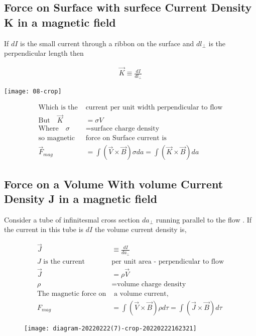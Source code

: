 \subsection{Force on Surface with surfece Current Density K in a magnetic field}
If $d I$ is the small current through a ribbon on the surface and $d l_{\perp}$ is the perpendicular length then \\
\begin{minipage}{.40\textwidth}
	\begin{align*}
	\vec{K} \equiv \frac{d I}{d l_{\perp}}
	\end{align*}
\end{minipage}
\begin{minipage}{.30\textwidth}
	\texttt{[image: 08-crop]}
\end{minipage}
\begin{align*}
\text{Which is the }&\text{current per unit width perpendicular to flow}\\
\text{But} \quad \vec{K}&=\sigma V\\
\text{Where} \quad \sigma&= \text{surface charge density}\\
\text{so magnetic }&\text{force on Surface current is}\\
\vec{F}_{m a g}&=\int(\vec{V} \times \vec{B}) \sigma d a=\int(\vec{K} \times \vec{B}) d a
\end{align*}
\subsection{Force on a Volume With volume Current Density J in a magnetic field}
Consider a tube of infinitesmal cross section $da_\perp$ running parallel to the flow . If the current in this tube is $dI$ the volume current density is,\\
\begin{minipage}{0.6\textwidth}
\begin{align*}
\vec{J} &\equiv \frac{d I}{d a_{\perp}}\\
\text{$J$ is the current }&\text{per unit area - perpendicular to flow}\\
\vec{J}&=\rho \vec{V}\\
\rho&= \text{volume charge density}\\
\text{The magnetic force  on}&\text{ a volume current,}\\
F_{mag}&=\int(\vec{V} \times \vec{B}) \rho d \tau=\int(\vec{J} \times \vec{B}) d \tau
\end{align*}
\end{minipage}
\begin{minipage}{0.5\textwidth}
\begin{figure}[H]
	\centering
	\texttt{[image: diagram-20220222(7)-crop-20220222162321]}
	\caption{}
	\label{}
\end{figure}	
\end{minipage}

